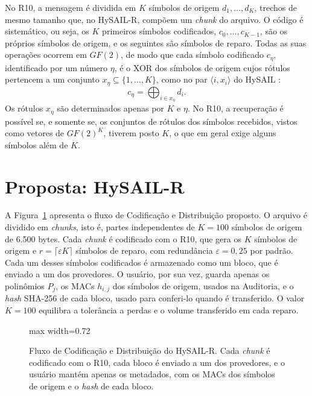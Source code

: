 \documentclass[portuguese]{sbc2025}%
\begin{document}
No R10, a mensagem é dividida em $K$ símbolos de origem $d_1, \ldots, d_K$, trechos de mesmo tamanho que, no HySAIL-R, compõem um \emph{chunk} do arquivo. O código é sistemático, ou seja, os $K$ primeiros símbolos codificados, $c_0, \ldots, c_{K-1}$, são os próprios símbolos de origem, e os seguintes são símbolos de reparo. Todas as suas operações ocorrem em $GF(2)$, de modo que cada símbolo codificado $c_\eta$, identificado por um número $\eta$, é o XOR dos símbolos de origem cujos rótulos pertencem a um conjunto $x_\eta \subseteq \{1, \ldots, K\}$, como no par $\langle i, x_i \rangle$ do HySAIL \citep{amaral2019hysail}:
\begin{equation}
c_\eta = \textstyle\bigoplus_{i \in x_\eta} d_i .
\label{eq:rotulos}
\end{equation}
Os rótulos $x_\eta$ são determinados apenas por $K$ e $\eta$. No R10, a recuperação é possível se, e somente se, os conjuntos de rótulos dos símbolos recebidos, vistos como vetores de $GF(2)^K$, tiverem posto $K$, o que em geral exige alguns símbolos além de $K$.

\section{Proposta: HySAIL-R}
\label{sec:proposta}

A Figura~\ref{fig:fluxo} apresenta o fluxo de Codificação e Distribuição proposto. O arquivo é dividido em \emph{chunks}, isto é, partes independentes de $K = 100$ símbolos de origem de 6.500 bytes. Cada \emph{chunk} é codificado com o R10, que gera os $K$ símbolos de origem e $r = \lceil \varepsilon K \rceil$ símbolos de reparo, com redundância $\varepsilon = 0{,}25$ por padrão. Cada um desses símbolos codificados é armazenado como um bloco, que é enviado a um dos provedores. O usuário, por sua vez, guarda apenas os polinômios $P_j$, os MACs $h_{i,j}$ dos símbolos de origem, usados na Auditoria, e o \emph{hash} SHA-256 de cada bloco, usado para conferi-lo quando é transferido. O valor $K = 100$ equilibra a tolerância a perdas e o volume transferido em cada reparo.

\begin{figure}[t]
	\centering
	\begin{adjustbox}{max width=0.72\textwidth}
		
	\end{adjustbox}
	\caption{Fluxo de Codificação e Distribuição do HySAIL-R. Cada \emph{chunk} é codificado com o R10, cada bloco é enviado a um dos provedores, e o usuário mantém apenas os metadados, com os MACs dos símbolos de origem e o \emph{hash} de cada bloco.}
	\label{fig:fluxo}
\end{figure}
\end{document}
